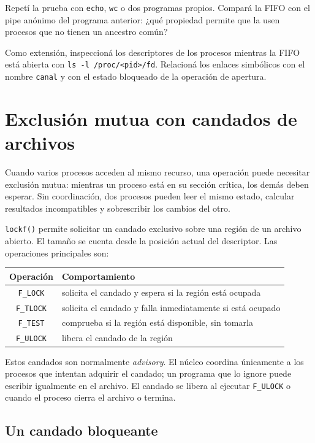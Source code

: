 \documentclass[11pt,a4paper]{article}
\begin{document}
Repetí la prueba con \texttt{echo}, \texttt{wc} o dos programas propios.
Compará la FIFO con el pipe anónimo del programa anterior: ¿qué propiedad
permite que la usen procesos que no tienen un ancestro común?

\begin{extrabox}
Como extensión, inspeccioná los descriptores de los procesos mientras la FIFO
está abierta con \texttt{ls -l /proc/\textless pid\textgreater/fd}. Relacioná
los enlaces simbólicos con el nombre \texttt{canal} y con el estado bloqueado de
la operación de apertura.
\end{extrabox}

\section{Exclusión mutua con candados de archivos}

Cuando varios procesos acceden al mismo recurso, una operación puede necesitar
exclusión mutua: mientras un proceso está en su sección crítica, los demás
deben esperar. Sin coordinación, dos procesos pueden leer el mismo estado,
calcular resultados incompatibles y sobrescribir los cambios del otro.

\texttt{lockf()} permite solicitar un candado exclusivo sobre una región de
un archivo abierto. El tamaño se cuenta desde la posición actual del
descriptor. Las operaciones principales son:

\begin{center}
\begin{tabular}{c|l}
\textbf{Operación} & \textbf{Comportamiento} \\
\hline
\texttt{F\_LOCK} & solicita el candado y espera si la región está ocupada \\
\texttt{F\_TLOCK} & solicita el candado y falla inmediatamente si está ocupado \\
\texttt{F\_TEST} & comprueba si la región está disponible, sin tomarla \\
\texttt{F\_ULOCK} & libera el candado de la región
\end{tabular}
\end{center}

Estos candados son normalmente \emph{advisory}. El núcleo coordina únicamente a
los procesos que intentan adquirir el candado; un programa que lo ignore puede
escribir igualmente en el archivo. El candado se libera al ejecutar
\texttt{F\_ULOCK} o cuando el proceso cierra el archivo o termina.

\subsection{Un candado bloqueante}
\end{document}
